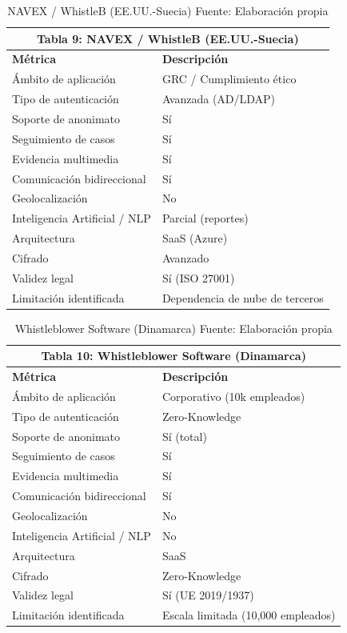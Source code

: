 \begin{table}[htbp]
\centering
\small
\begin{tabular}{|l|l|}
\hline \multicolumn{2}{|c|}{\textbf{Tabla 9: NAVEX / WhistleB (EE.UU.-Suecia)}} \\
\hline \textbf{Métrica} & \textbf{Descripción} \\
\hline Ámbito de aplicación & GRC / Cumplimiento ético \\
\hline Tipo de autenticación & Avanzada (AD/LDAP) \\
\hline Soporte de anonimato & Sí \\
\hline Seguimiento de casos & Sí \\
\hline Evidencia multimedia & Sí \\
\hline Comunicación bidireccional & Sí \\
\hline Geolocalización & No \\
\hline Inteligencia Artificial / NLP & Parcial (reportes) \\
\hline Arquitectura & SaaS (Azure) \\
\hline Cifrado & Avanzado \\
\hline Validez legal & Sí (ISO 27001) \\
\hline Limitación identificada & Dependencia de nube de terceros \\
\hline \end{tabular}
\caption{NAVEX / WhistleB (EE.UU.-Suecia) \label{tab:navex} \footnotesize Fuente: Elaboración propia \cite{17}} 
\end{table}


\begin{table}[htbp]
\centering
\small
\begin{tabular}{|l|l|}
\hline \multicolumn{2}{|c|}{\textbf{Tabla 10: Whistleblower Software (Dinamarca)}} \\
\hline \textbf{Métrica} & \textbf{Descripción} \\
\hline Ámbito de aplicación & Corporativo (10k empleados) \\
\hline Tipo de autenticación & Zero-Knowledge \\
\hline Soporte de anonimato & Sí (total) \\
\hline Seguimiento de casos & Sí \\
\hline Evidencia multimedia & Sí \\
\hline Comunicación bidireccional & Sí \\
\hline Geolocalización & No \\
\hline Inteligencia Artificial / NLP & No \\
\hline Arquitectura & SaaS \\
\hline Cifrado & Zero-Knowledge \\
\hline Validez legal & Sí (UE 2019/1937) \\
\hline Limitación identificada & Escala limitada (10,000 empleados) \\
\hline \end{tabular}
\caption{Whistleblower Software (Dinamarca) \label{tab:whistleblowersw} \footnotesize Fuente: Elaboración propia \cite{18}} 
\end{table}



